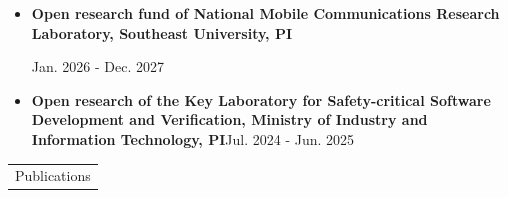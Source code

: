 \documentclass{article}
\renewcommand{\section}[1]{%
  \begin{tabular}{p{\dimexpr\linewidth-2\tabcolsep}}
    \cellcolor{black!10}\large\strut #1
  \end{tabular}%
}
\newcommand{\heading}[2][\relax]{\textbf{#2}\hfill#1\par\nobreak}
\begin{document}
\begin{justifying}
\begin{itemize}
\begin{subitems}
		\end{subitems}
		\item \heading{Open research fund of National Mobile Communications Research Laboratory, Southeast University, PI}
		\hfill{Jan. 2026 - Dec. 2027}
		\item \heading[Jul. 2024 - Jun. 2025]{Open research of the Key Laboratory for Safety-critical Software Development and Verification, Ministry of Industry and Information Technology, PI}
	\end{itemize}
\end{justifying}

\section{Publications}
\end{document}
